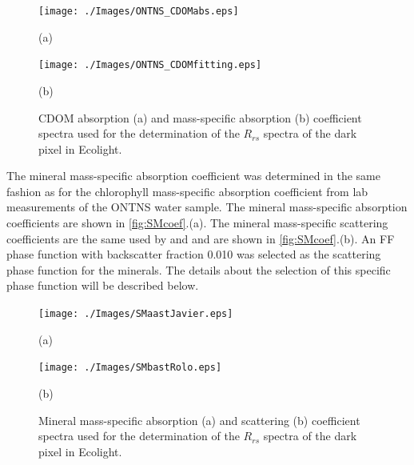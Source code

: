 \documentclass[onecolumn,3p,letterpaper]{elsarticle}
\begin{document}
\begin{figure}[htbp!]
	\begin{minipage}[c]{0.48\linewidth}
  		\centering
  		\texttt{[image: ./Images/ONTNS\_CDOMabs.eps]}
		\centerline{(a)}\medskip
  	\end{minipage}  
  	\hfill
  	\begin{minipage}[c]{0.48\linewidth}
    	\centering
  		\texttt{[image: ./Images/ONTNS\_CDOMfitting.eps]}
  		\centerline{(b)}\medskip
  	\end{minipage}  
  	\caption{CDOM absorption (a) and mass-specific absorption (b) coefficient spectra used for the determination of the $R_{rs}$ spectra of the dark pixel in Ecolight. \label{fig:CDOMcoef} }
\end{figure}

The mineral mass-specific absorption coefficient was determined in the same fashion as for the chlorophyll mass-specific absorption coefficient from lab measurements of the ONTNS water sample. The mineral mass-specific absorption coefficients are shown in \autoref{fig:SMcoef}.(a). The mineral mass-specific scattering coefficients are the same used by \cite{Raqueno:2000} and \cite{Raqueno:2003} and are shown in \autoref{fig:SMcoef}.(b). An FF phase function with backscatter fraction 0.010 was selected as the scattering phase function for the minerals. The details about the selection of this specific phase function will be described below.

\begin{figure}[htbp!]
	\begin{minipage}[c]{0.48\linewidth}
  		\centering
  		\texttt{[image: ./Images/SMaastJavier.eps]}
	  	\centerline{(a)}\medskip
  	\end{minipage}  
  	\hfill
  	\begin{minipage}[c]{0.48\linewidth}
  		\centering
  		\texttt{[image: ./Images/SMbastRolo.eps]}
  		\centerline{(b)}\medskip
  	\end{minipage}
  	\caption{Mineral mass-specific absorption (a) and scattering (b) coefficient spectra used for the determination of the $R_{rs}$ spectra of the dark pixel in Ecolight. \label{fig:SMcoef} }
\end{figure}
\end{document}
